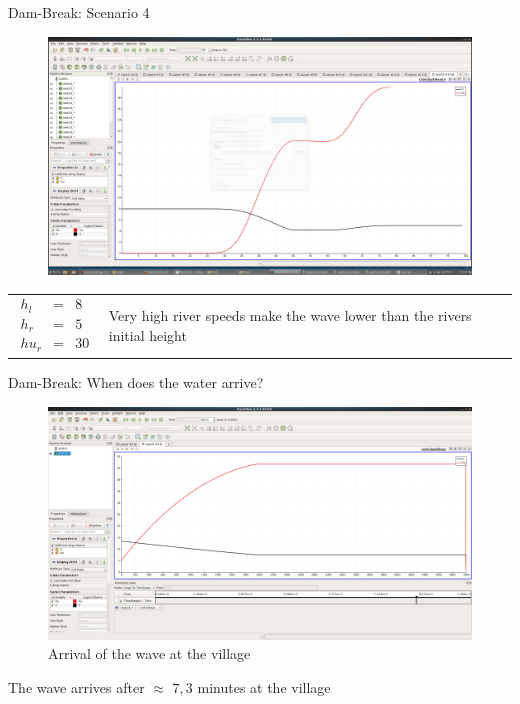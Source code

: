 \documentclass[shortpres]{beamer}
\newcommand{\imgvoffset}{-20pt}
\newcommand{\imgfullscale}{0.75}
\begin{document}
\begin{frame}{Dam-Break: Scenario 4}
	\begin{figure}[t]
		\vspace{\imgvoffset}
		\includegraphics[width=\imgfullscale\linewidth]{img/Dam_highspeedriver.png}
	\end{figure}
	
	\begin{tabular}{m{3cm} m{\linewidth-5cm}}
		$
		\begin{matrix}
		h_l & = & 8\\
		h_r & = & 5\\
		hu_r & = & 30
		\end{matrix}
		$
		&
		
		Very high river speeds make the wave lower than the rivers initial height
	\end{tabular}
\end{frame}


\begin{frame}{Dam-Break: When does the water arrive?}
	\begin{figure}[t]
		\vspace{\imgvoffset}
		\includegraphics[width=\imgfullscale\linewidth]{img/4_dorf_arrival_as_graph.png}
		\caption*{Arrival of the wave at the village}
	\end{figure}
	The wave arrives after $\approx$ $7,3$ minutes at the village
\end{frame}
\end{document}
